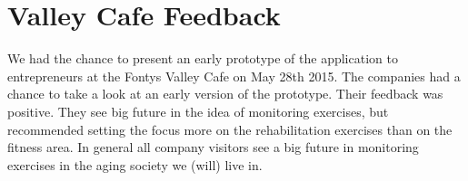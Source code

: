 \section{Valley Cafe Feedback}
We had the chance to present an early prototype of the application to entrepreneurs at the Fontys Valley Cafe on May 28th 2015.
The companies had a chance to take a look at an early version of the prototype. Their feedback was positive. They see big future in the idea of monitoring exercises, but recommended setting the focus more on the rehabilitation exercises than on the fitness area. In general all company visitors see a big future in monitoring exercises in the aging society we (will) live in.